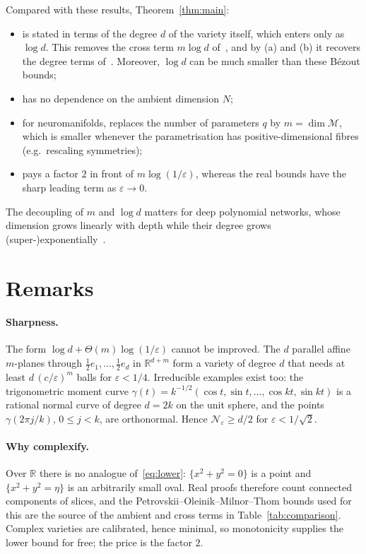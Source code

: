 \documentclass[11pt]{article}
\newcommand{\R}{\mathbb{R}}
\newcommand{\cM}{\mathcal{M}}
\newcommand{\cN}{\mathcal{N}}
\begin{document}
Compared with these results, Theorem~\ref{thm:main}:
\begin{itemize}
\item is stated in terms of the degree $d$ of the variety itself, which enters
  only as $\log d$. This removes the cross term $m\log d$ of~\cite{KTB19}, and
  by (a) and (b) it recovers the degree terms of~\cite{ZK23}. Moreover,
  $\log d$ can be much smaller than these Bézout bounds;
\item has no dependence on the ambient dimension $N$;
\item for neuromanifolds, replaces the number of parameters $q$ by
  $m=\dim\cM$, which is smaller whenever the parametrisation has
  positive-dimensional fibres (e.g.\ rescaling symmetries);
\item pays a factor $2$ in front of $m\log(1/\varepsilon)$, whereas the real
  bounds have the sharp leading term as $\varepsilon\to0$.
\end{itemize}
The decoupling of $m$ and $\log d$ matters for deep polynomial networks, whose
dimension grows linearly with depth while their degree grows
(super-)exponentially~\cite{SMK25}.

\section{Remarks}

\paragraph{Sharpness.} The form $\log d+\Theta(m)\log(1/\varepsilon)$ cannot be
improved. The $d$ parallel affine $m$-planes through
$\tfrac12e_1,\dots,\tfrac12e_d$ in $\R^{d+m}$ form a variety of degree $d$ that
needs at least $d\,(c/\varepsilon)^m$ balls for $\varepsilon<1/4$. Irreducible
examples exist too: the trigonometric moment curve
$\gamma(t)=k^{-1/2}(\cos t,\sin t,\dots,\cos kt,\sin kt)$ is a rational normal
curve of degree $d=2k$ on the unit sphere, and the points $\gamma(2\pi j/k)$,
$0\le j<k$, are orthonormal. Hence $\cN_\varepsilon\ge d/2$ for
$\varepsilon<1/\sqrt2$.

\paragraph{Why complexify.} Over $\R$ there is no analogue
of~\eqref{eq:lower}: $\{x^2+y^2=0\}$ is a point and $\{x^2+y^2=\eta\}$ is an
arbitrarily small oval. Real proofs therefore count connected components of
slices, and the Petrovskii--Oleinik--Milnor--Thom bounds used for this are the
source of the ambient and cross terms in Table~\ref{tab:comparison}. Complex
varieties are calibrated, hence minimal, so monotonicity supplies the lower bound
for free; the price is the factor $2$.
\end{document}
